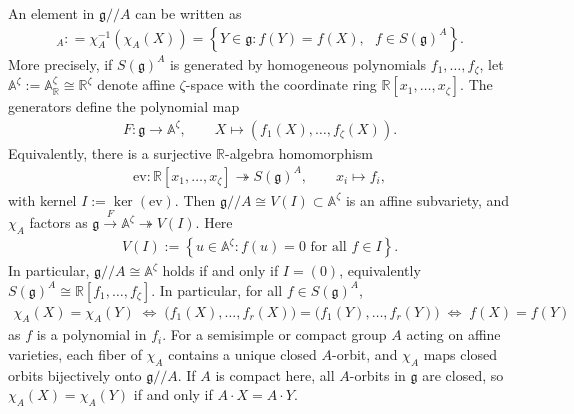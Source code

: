 \documentclass[11pt]{amsart}
\theoremstyle{definition}
\theoremstyle{plain}
\theoremstyle{conclusion}
\begin{document}
An element in $\mathfrak{g}//A$ can be written as \begin{align}
    [X]_A : = \chi_A^{-1}\left(\chi_A(X)\right) =   \left\{Y \in \mathfrak{g}: f(Y) = f(X), \text{ } f \in S(\mathfrak{g})^A\right\}. \label{eq:pointsinquo}
\end{align}   More precisely, if $S(\mathfrak{g})^A$ is generated by homogeneous polynomials $f_1,\dots,f_\zeta$, let $\mathbb{A}^\zeta:=\mathbb{A}^\zeta_{\mathbb{R}}\cong \mathbb{R}^\zeta$ denote affine $\zeta$-space with the coordinate ring $\mathbb{R}[x_1,\ldots,x_\zeta]$. The generators define the polynomial map
\begin{align*}
F : \mathfrak{g} \longrightarrow \mathbb{A}^\zeta, \qquad X \longmapsto (f_1(X),\ldots,f_\zeta(X)).
\end{align*}
Equivalently, there is a surjective $\mathbb{R}$-algebra homomorphism
\begin{align*}
\mathrm{ev}: \mathbb{R}[x_1,\ldots,x_\zeta] \twoheadrightarrow S(\mathfrak{g})^A,\qquad x_i\longmapsto f_i,
\end{align*}
with kernel $I:=\ker(\mathrm{ev})$. Then $\mathfrak{g}//A\cong V(I)\subset \mathbb{A}^\zeta$ is an affine subvariety, and $\chi_A$ factors as $\mathfrak{g}\xrightarrow{\,F\,}\mathbb{A}^\zeta\twoheadrightarrow V(I)$. Here
\begin{align*}
    V(I) := \left\{u \in \mathbb{A}^\zeta : f(u) = 0 \text{ for all } f \in I\right\}.
\end{align*}
In particular, $\mathfrak{g}//A \cong \mathbb{A}^\zeta$ holds if and only if $I=(0)$, equivalently $S(\mathfrak{g})^A \cong \mathbb{R}[f_1,\ldots,f_\zeta]$. %
In particular, for all $f \in S(\mathfrak{g})^A$, \begin{align*}
    \chi_A(X)=\chi_A(Y) \;\Longleftrightarrow\; \big(f_1(X),\dots,f_r(X)\big)=\big(f_1(Y),\dots,f_r(Y)\big) \;\Longleftrightarrow\;f(X)=  f(Y) 
\end{align*} as $f$ is a polynomial in $f_i$.   For a semisimple or compact group $A$ acting on affine varieties, each fiber of $\chi_A$ contains a unique closed $A$-orbit, and $\chi_A$ maps closed orbits bijectively onto $\mathfrak{g}//A$. If $A$ is compact here, all $A$-orbits in $\mathfrak{g}$ are closed, so $\chi_A(X)=\chi_A(Y)$ if and only if $A \cdot X=A \cdot Y$. 
\end{document}
